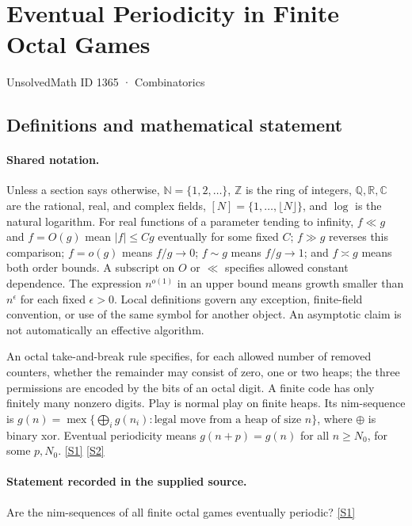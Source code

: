 \documentclass[11pt,a4paper]{article}
\newcommand{\N}{\mathbb{N}}
\newcommand{\Z}{\mathbb{Z}}
\newcommand{\Q}{\mathbb{Q}}
\newcommand{\R}{\mathbb{R}}
\newcommand{\C}{\mathbb{C}}
\newcommand{\sref}[2]{\hyperlink{source:#1:#2}{[S#2]}}
\begin{document}

\setcounter{section}{1364}

\section{Eventual Periodicity in Finite Octal Games}\label{1365}

{\small\sffamily UnsolvedMath ID 1365 · Combinatorics}

\subsection{Definitions and mathematical statement}

\paragraph{Shared notation.}Unless a section says otherwise, $\N=\{1,2,\ldots\}$,
$\Z$ is the ring of integers, $\Q,\R,\C$ are the rational, real, and complex
fields, $[N]=\{1,\ldots,\lfloor N\rfloor\}$, and $\log$ is the natural
logarithm. For real functions of a parameter tending to infinity,
$f\ll g$ and $f=O(g)$ mean $|f|\leq Cg$ eventually for some fixed $C$;
$f\gg g$ reverses this comparison; $f=o(g)$ means $f/g\to0$;
$f\sim g$ means $f/g\to1$; and $f\asymp g$ means both order bounds.
A subscript on $O$ or $\ll$ specifies allowed constant dependence.
The expression $n^{o(1)}$ in an upper bound means growth smaller than
$n^\epsilon$ for each fixed $\epsilon>0$. Local definitions govern any
exception, finite-field convention, or use of the same symbol for another
object. An asymptotic claim is not automatically an effective algorithm.



An octal take-and-break rule specifies, for each allowed number of removed counters, whether the remainder may consist of zero, one or two heaps; the three permissions are encoded by the bits of an octal digit. A finite code has only finitely many nonzero digits. Play is normal play on finite heaps. Its nim-sequence is $g(n)=\operatorname{mex}\{\bigoplus_i g(n_i):\text{legal move from a heap of size }n\}$, where $\oplus$ is binary xor. Eventual periodicity means $g(n+p)=g(n)$ for all $n\geq N_0$, for some $p,N_0$. \sref{1365}{1} \sref{1365}{2}

\paragraph{Statement recorded in the supplied source.}
Are the nim-sequences of all finite octal games eventually periodic? \sref{1365}{1}
\end{document}
